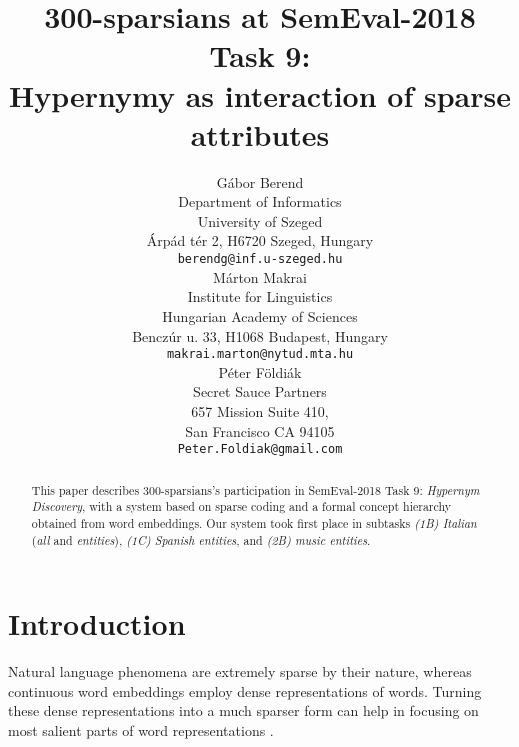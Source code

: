 \documentclass[11pt,a4paper]{article}
\title{300-sparsians at SemEval-2018 Task 9: \\
Hypernymy as interaction of sparse attributes}
\author{Gábor Berend \\
Department of Informatics \\ University of Szeged \\
Árpád tér 2, H6720 Szeged, Hungary \\
{\tt berendg@inf.u-szeged.hu} \\\And
  Márton Makrai  \\
  Institute for Linguistics \\
  Hungarian Academy of Sciences \\
  Benczúr u. 33, H1068 Budapest, Hungary \\
  {\tt makrai.marton@nytud.mta.hu} \\\AND
  Péter Földiák \\
  Secret Sauce Partners \\
  657 Mission Suite 410, \\
  San Francisco CA 94105 \\
  {\tt Peter.Foldiak@gmail.com} \\}
\date{}
\begin{document}
\maketitle

\begin{abstract}
  This paper describes 300-sparsians’s participation in SemEval-2018 Task 9:
  \emph{Hypernym Discovery}, with a system based on sparse coding and a formal
  concept hierarchy obtained from word embeddings.
  Our system took first place in subtasks
  \emph{(1B) Italian} (\emph{all} and \emph{entities}),
  \emph{(1C) Spanish entities}, and
  \emph{(2B) music entities}.
\end{abstract}


\section{Introduction}

Natural language phenomena are extremely sparse by their nature,
whereas continuous word embeddings employ dense representations of words.
Turning these dense representations into a much sparser form can help in
focusing on most salient parts of word representations
\citep{Faruqui:2015,Berend:2017,Subramanian:2018}.

\end{document}
